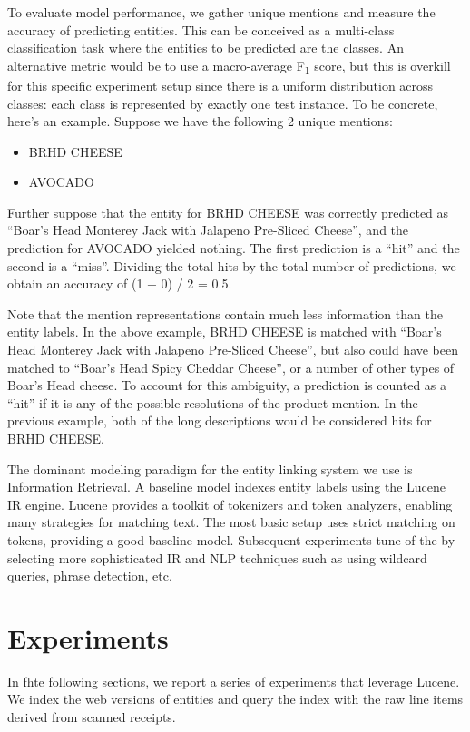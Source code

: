 \documentclass[11pt,a4paper]{article}
\newenvironment{myitemize}
{ \begin{itemize}
    \setlength{\itemsep}{0pt}
    \setlength{\parskip}{0pt}
    \setlength{\parsep}{0pt}     }
{ \end{itemize}                  }
\begin{document}
To evaluate model performance, we gather unique mentions and
measure the accuracy of predicting entities.  This can be conceived as
a multi-class classification task where the entities to be predicted
are the classes.  An alternative metric would be to use a
macro-average F\textsubscript{1} score, but this is overkill for this specific
experiment setup since there is a uniform distribution across classes:
each class is represented by exactly one test instance. 
To be concrete, here’s an example.  Suppose we have the following 2
unique mentions: 
\begin{myitemize}
\item BRHD CHEESE
\item AVOCADO
\end{myitemize}
Further suppose that the entity for BRHD CHEESE was correctly
predicted as “Boar's Head Monterey Jack with Jalapeno Pre-Sliced
Cheese”, and the prediction for AVOCADO yielded nothing.  The first
prediction is a ``hit'' and the second is a ``miss''.  Dividing the
total hits by the total number of predictions, we obtain an accuracy
of (1 + 0) / 2 = 0.5. 

Note that the mention representations contain
much less information than the entity labels.  In the above example,
BRHD CHEESE is matched with  ``Boar's Head Monterey Jack with Jalapeno
Pre-Sliced Cheese'', but also could have been matched to  ``Boar's
Head Spicy Cheddar Cheese'', or a number of other types of Boar’s Head
cheese.  To account for this ambiguity, a prediction is counted as a
“hit” if it is any of the possible resolutions of the product mention.
In the previous example, both of the long descriptions would be
considered hits for BRHD CHEESE. 

The dominant modeling paradigm for the entity linking system we use is
Information Retrieval.   A baseline model indexes entity labels using the Lucene
~\cite{lucene} IR
engine.  Lucene provides a toolkit of tokenizers and token analyzers,
enabling many strategies for matching text.  The most basic setup uses
strict matching on tokens, providing a good baseline model.
Subsequent experiments tune of the by selecting more
sophisticated IR and NLP techniques such as using wildcard
queries, phrase detection, etc.

\section{Experiments}

In fhte following sections, we report a series of experiments that
leverage Lucene.  We index the web versions of entities and query the
index with the raw line items derived from scanned receipts.
\end{document}
